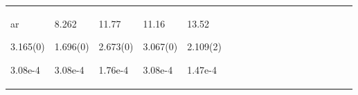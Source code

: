 \begin{longtable}{|p{0.01cm}|p{0.25cm}p{0.25cm}p{0.25cm}p{0.25cm}p{0.25cm}p{0.25cm}p{0.25cm}p{0.25cm}p{0.25cm}p{0.25cm}p{0.25cm}p{0.25cm}p{0.25cm}p{0.25cm}p{0.25cm}p{0.25cm}p{0.25cm}|}
ar{\tiny \parbox{1cm}{\hspace{-0.17cm}3.165(0)}}\par{\tiny \parbox{1cm}{\hspace{-0.17cm}3.08e-4}} & \par{\tiny \parbox{1cm}{\hspace{-0.17cm}8.262}}\par{\tiny \parbox{1cm}{\hspace{-0.17cm}1.696(0)}}\par{\tiny \parbox{1cm}{\hspace{-0.17cm}3.08e-4}} & \par{\tiny \parbox{1cm}{\hspace{-0.17cm}11.77}}\par{\tiny \parbox{1cm}{\hspace{-0.17cm}2.673(0)}}\par{\tiny \parbox{1cm}{\hspace{-0.17cm}1.76e-4}} & \par{\tiny \parbox{1cm}{\hspace{-0.17cm}11.16}}\par{\tiny \parbox{1cm}{\hspace{-0.17cm}3.067(0)}}\par{\tiny \parbox{1cm}{\hspace{-0.17cm}3.08e-4}} & \par{\tiny \parbox{1cm}{\hspace{-0.17cm}13.52}}\par{\tiny \parbox{1cm}{\hspace{-0.17cm}2.109(2)}}\par{\tiny \parbox{1cm}{\hspace{-0.17cm}1.47e-4}}\\

\end{longtable}
